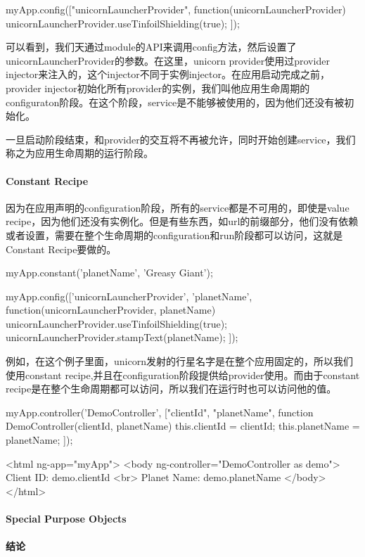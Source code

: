 	\begin{JavaScript}
myApp.config(["unicornLauncherProvider", function(unicornLauncherProvider) {
  unicornLauncherProvider.useTinfoilShielding(true);
}]);	
	\end{JavaScript}
	
	
	可以看到，我们天通过module的API来调用config方法，然后设置了unicornLauncherProvider的参数。在这里，unicorn provider使用过provider injector来注入的，这个injector不同于实例injector。在应用启动完成之前，provider injector初始化所有provider的实例，我们叫他应用生命周期的configuraton阶段。在这个阶段，service是不能够被使用的，因为他们还没有被初始化。
	
	一旦启动阶段结束，和provider的交互将不再被允许，同时开始创建service，我们称之为应用生命周期的运行阶段。
	
	
	\paragraph{Constant Recipe}
	
	因为在应用声明的configuration阶段，所有的service都是不可用的，即使是value recipe，因为他们还没有实例化。但是有些东西，如url的前缀部分，他们没有依赖或者设置，需要在整个生命周期的configuration和run阶段都可以访问，这就是Constant Recipe要做的。
	
	
	\begin{JavaScript}
myApp.constant('planetName', 'Greasy Giant');	
	\end{JavaScript}
	
	
	\begin{JavaScript}
myApp.config(['unicornLauncherProvider', 'planetName', function(unicornLauncherProvider, planetName) {
  unicornLauncherProvider.useTinfoilShielding(true);
  unicornLauncherProvider.stampText(planetName);
}]);	
	\end{JavaScript}
	
	例如，在这个例子里面，unicorn发射的行星名字是在整个应用固定的，所以我们使用constant recipe,并且在configuration阶段提供给provider使用。而由于constant recipe是在整个生命周期都可以访问，所以我们在运行时也可以访问他的值。
	
	
	\begin{JavaScript}
myApp.controller('DemoController', ["clientId", "planetName", function DemoController(clientId, planetName) {
  this.clientId = clientId;
  this.planetName = planetName;
}]);	
	\end{JavaScript}
	  
	\begin{HTML}
<html ng-app="myApp">
  <body ng-controller="DemoController as demo">
   Client ID: {{demo.clientId}}
   <br>
   Planet Name: {{demo.planetName}}
  </body>
</html>	
	\end{HTML}  
	
	
	\paragraph{Special Purpose Objects}
	
	
	\paragraph{结论}
	
	
  
